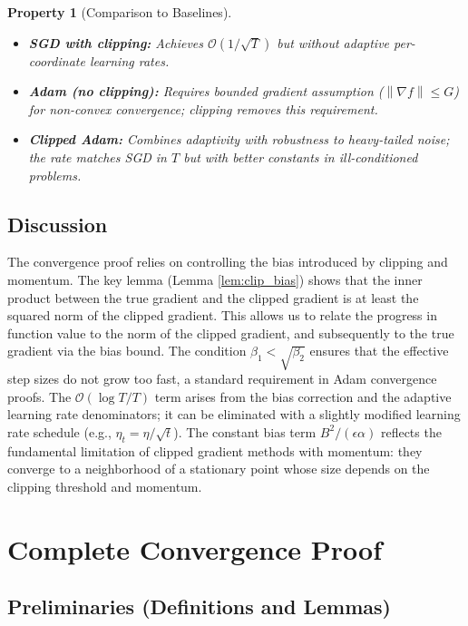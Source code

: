 \documentclass{article}
\newtheorem{property}{Property}
\newcommand{\norm}[1]{\left\| #1 \right\|}
\begin{document}
\begin{property}[Comparison to Baselines]
    \begin{itemize}
        \item \textbf{SGD with clipping:} Achieves $\mathcal{O}(1/\sqrt{T})$ but without adaptive per-coordinate learning rates.
        \item \textbf{Adam (no clipping):} Requires bounded gradient assumption ($\norm{\nabla f} \le G$) for non-convex convergence; clipping removes this requirement.
        \item \textbf{Clipped Adam:} Combines adaptivity with robustness to heavy-tailed noise; the rate matches SGD in $T$ but with better constants in ill-conditioned problems.
    \end{itemize}
\end{property}

\subsection*{Discussion}
The convergence proof relies on controlling the bias introduced by clipping and momentum. The key lemma (Lemma \ref{lem:clip_bias}) shows that the inner product between the true gradient and the clipped gradient is at least the squared norm of the clipped gradient. This allows us to relate the progress in function value to the norm of the clipped gradient, and subsequently to the true gradient via the bias bound. The condition $\beta_1 < \sqrt{\beta_2}$ ensures that the effective step sizes do not grow too fast, a standard requirement in Adam convergence proofs. The $\mathcal{O}(\log T / T)$ term arises from the bias correction and the adaptive learning rate denominators; it can be eliminated with a slightly modified learning rate schedule (e.g., $\eta_t = \eta/\sqrt{t}$). The constant bias term $B^2/(\epsilon \alpha)$ reflects the fundamental limitation of clipped gradient methods with momentum: they converge to a neighborhood of a stationary point whose size depends on the clipping threshold and momentum.

\section*{Complete Convergence Proof}

\subsection*{Preliminaries (Definitions and Lemmas)}
\end{document}
